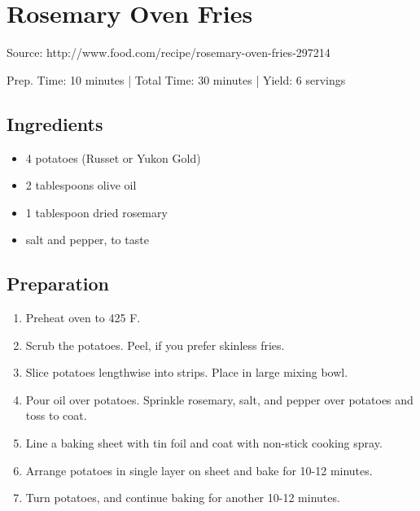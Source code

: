 \section{Rosemary Oven Fries}

Source: http://www.food.com/recipe/rosemary-oven-fries-297214

\begin{center}
Prep. Time: 10 minutes |
Total Time: 30 minutes | 
Yield: 6 servings
\end{center}

\subsection{Ingredients}
\begin{itemize}
    \item 4 potatoes (Russet or Yukon Gold)
    \item 2 tablespoons olive oil
    \item 1 tablespoon dried rosemary
    \item salt and pepper, to taste
\end{itemize}

\subsection{Preparation}
\begin{enumerate}
    \item Preheat oven to 425 F.
    \item Scrub the potatoes. Peel, if you prefer skinless fries.
    \item Slice potatoes lengthwise into strips. Place in large mixing bowl.
    \item Pour oil over potatoes. Sprinkle rosemary, salt, and pepper over potatoes and toss to coat.
    \item Line a baking sheet with tin foil and coat with non-stick cooking spray.    
    \item Arrange potatoes in single layer on sheet and bake for 10-12 minutes.
    \item Turn potatoes, and continue baking for another 10-12 minutes.
\end{enumerate}
